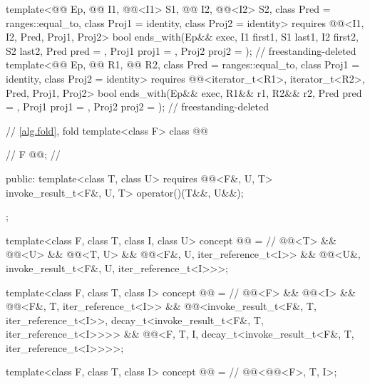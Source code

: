 \begin{codeblock}
{{    template<@@ Ep, @@ I1, @@<I1> S1,
             @@ I2, @@<I2> S2,
             class Pred = ranges::equal_to, class Proj1 = identity, class Proj2 = identity>
      requires @@<I1, I2, Pred, Proj1, Proj2>
      bool ends_with(Ep&& exec, I1 first1, S1 last1, I2 first2, S2 last2,
                     Pred pred = {}, Proj1 proj1 = {}, Proj2 proj2 = {});   // freestanding-deleted
    template<@@ Ep, @@ R1,
             @@ R2, class Pred = ranges::equal_to,
             class Proj1 = identity, class Proj2 = identity>
      requires @@<iterator_t<R1>, iterator_t<R2>, Pred, Proj1, Proj2>
      bool ends_with(Ep&& exec, R1&& r1, R2&& r2,
                     Pred pred = {}, Proj1 proj1 = {}, Proj2 proj2 = {});   // freestanding-deleted

    // \ref{alg.fold}, fold
    template<class F>
    class @@ {     // \expos
      F @@;              // \expos

    public:
      template<class T, class U> requires @@<F&, U, T>
      invoke_result_t<F&, U, T> operator()(T&&, U&&);
    };

    template<class F, class T, class I, class U>
      concept @@ =  // \expos
        @@<T> && @@<U> &&
        @@<T, U> && @@<F&, U, iter_reference_t<I>> &&
        @@<U&, invoke_result_t<F&, U, iter_reference_t<I>>>;

    template<class F, class T, class I>
      concept @@ =      // \expos
        @@<F> && @@<I> &&
        @@<F&, T, iter_reference_t<I>> &&
        @@<invoke_result_t<F&, T, iter_reference_t<I>>,
               decay_t<invoke_result_t<F&, T, iter_reference_t<I>>>> &&
        @@<F, T, I,
                        decay_t<invoke_result_t<F&, T, iter_reference_t<I>>>>;

    template<class F, class T, class I>
      concept @@ =    // \expos
        @@<@@<F>, T, I>;

}}
\end{codeblock}
